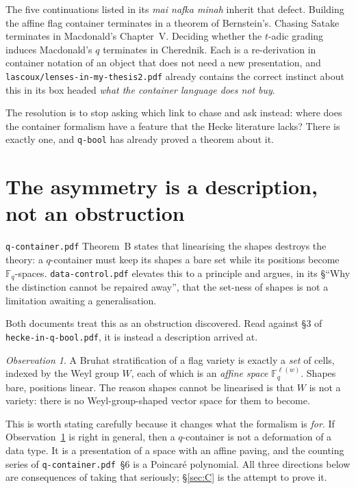 \documentclass[11pt,a4paper]{article}
\theoremstyle{definition}
\theoremstyle{remark}
\newtheorem{observation}[theorem]{Observation}
\newcommand{\HQB}{\texttt{hecke-\allowbreak{}in-\allowbreak{}q-\allowbreak{}bool.pdf}}
\newcommand{\FF}{\mathbb{F}}
\begin{document}
The five continuations listed in its \emph{mai nafka minah} inherit that
defect. Building the affine flag container terminates in a theorem of
Bernstein's. Chasing Satake terminates in Macdonald's Chapter~V. Deciding
whether the $t$-adic grading induces Macdonald's $q$ terminates in Cherednik.
Each is a re-derivation in container notation of an object that does not need a
new presentation, and \texttt{lascoux/lenses-in-my-thesis2.pdf} already contains
the correct instinct about this in its box headed \emph{what the container
language does not buy}.

The resolution is to stop asking which link to chase and ask instead: where does
the container formalism have a feature that the Hecke literature lacks? There is
exactly one, and \texttt{q-bool} has already proved a theorem about it.

\section{The asymmetry is a description, not an
obstruction}\label{sec:asym}

\texttt{q-container.pdf} Theorem~B states that linearising the shapes destroys
the theory: a $q$-container must keep its shapes a bare set while its positions
become $\FF_q$-spaces. \texttt{data-control.pdf} elevates this to a principle
and argues, in its \S``Why the distinction cannot be repaired away'', that the
set-ness of shapes is not a limitation awaiting a generalisation.

Both documents treat this as an obstruction discovered. Read against \S3 of
\HQB{}, it is instead a description arrived at.

\begin{observation}\label{obs:asym}
A Bruhat stratification of a flag variety is exactly a \emph{set} of
cells, indexed by the Weyl group $W$, each of which is an \emph{affine
space} $\FF_q^{\ell(w)}$. Shapes bare, positions linear. The reason shapes cannot be
linearised is that $W$ is not a variety: there is no Weyl-group-shaped vector
space for them to become.
\end{observation}

This is worth stating carefully because it changes what the formalism is
\emph{for}. If Observation~\ref{obs:asym} is right in general, then a
$q$-container is not a deformation of a data type. It is a presentation of a
space with an affine paving, and the counting series of
\texttt{q-container.pdf}~\S6 is a Poincar\'e polynomial. All three directions
below are consequences of taking that seriously; \S\ref{sec:C} is the attempt to
prove it.
\end{document}
